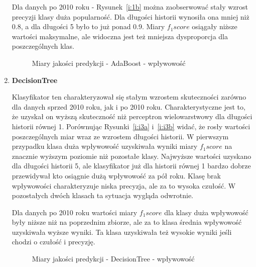 \documentclass[polish,12pt]{aghthesis}
\begin{document}
\begin{enumerate}
    Dla danych po 2010 roku - Rysunek~\ref{i:1b} można zaobserwować stały wzrost precyzji klasy duża popularność. Dla długości historii wynosiła ona mniej niż 0.8, a dla długości 5 było to już ponad 0.9. Miary \textit{$f_1 score$} osiągały niższe wartości maksymalne, ale widoczna jest też mniejsza dysproporcja dla poszczególnych klas.
    
            \begin{figure}[ht] 
    \centering
    \hfill%
    \label{i:i2}
    \caption{Miary jakości predykcji - AdaBoost - wpływowość}
    
\end{figure}

\FloatBarrier
    

    \item \textbf{DecisionTree}
    
    Klasyfikator ten charakteryzował się stałym wzrostem skuteczności zarówno dla danych sprzed 2010 roku, jak i po 2010 roku. Charakterystyczne jest to, że uzyskał on wyższą skuteczność niż perceptron wielowarstwowy dla długości historii równej 1. Porównując Rysunki~\ref{i:i3a} i~\ref{i:i3b} widać, że rosły wartości poszczególnych miar wraz ze wzrostem długości historii. W pierwszym przypadku klasa duża wpływowość uzyskiwała wyniki miary \textit{$f_1 score$} na znacznie wyższym poziomie niż pozostałe klasy. Najwyższe wartości uzyskano dla długości historii 5, ale klasyfikator już dla historii równej 1 bardzo dobrze przewidywał kto osiągnie dużą wpływowość za pół roku. Klasę brak wpływowości charakteryzuje niska precyzja, ale za to wysoka czułość. W pozostałych dwóch klasach ta sytuacja wygląda odwrotnie. 
    
    Dla danych po 2010 roku wartości miary \textit{$f_1 score$} dla klasy duża wpływowość były niższe niż na poprzednim zbiorze, ale za to klasa średnia wpływowość uzyskiwała wyższe wyniki. Ta klasa uzyskiwała też wysokie wyniki jeśli chodzi o czułość i precyzję.
    
    
            \begin{figure}[ht] 
    \centering
    \hfill%
    \label{i:i3}
    \caption{Miary jakości predykcji - DecisionTree - wpływowość}


\end{figure}
\end{enumerate}
\end{document}
